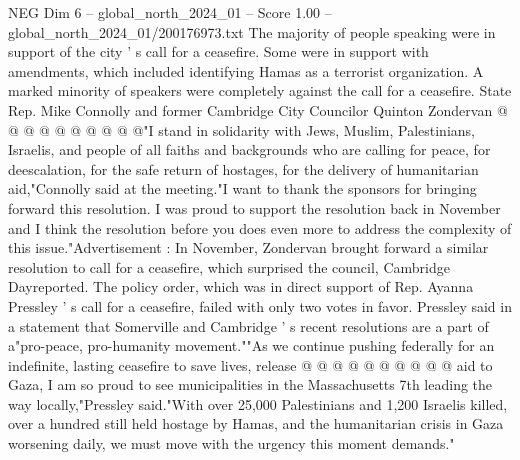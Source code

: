 \begin{textsample}{NEG Dim 6 – global\_north\_2024\_01 – Score 1.00 – global\_north\_2024\_01/200176973.txt}
The majority of people speaking were in support of the city ' s call for a ceasefire.
Some were in support with amendments, which included identifying Hamas as a terrorist organization.
A marked minority of speakers were completely against the call for a ceasefire.
State Rep.
Mike Connolly and former Cambridge City Councilor Quinton Zondervan @ @ @ @ @ @ @ @ @ @"I stand in solidarity with Jews, Muslim, Palestinians, Israelis, and people of all faiths and backgrounds who are calling for peace, for deescalation, for the safe return of hostages, for the delivery of humanitarian aid,"Connolly said at the meeting."I want to thank the sponsors for bringing forward this resolution.
I was proud to support the resolution back in November and I think the resolution before you does even more to address the complexity of this issue."Advertisement : In November, Zondervan brought forward a similar resolution to call for a ceasefire, which surprised the council, Cambridge Dayreported.
The policy order, which was in direct support of Rep.
Ayanna Pressley ' s call for a ceasefire, failed with only two votes in favor.
Pressley said in a statement that Somerville and Cambridge ' s recent resolutions are a part of a"pro-peace, pro-humanity movement.""As we continue pushing federally for an indefinite, lasting ceasefire to save lives, release @ @ @ @ @ @ @ @ @ @ aid to Gaza, I am so proud to see municipalities in the Massachusetts 7th leading the way locally,"Pressley said."With over 25,000 Palestinians and 1,200 Israelis killed, over a hundred still held hostage by Hamas, and the humanitarian crisis in Gaza worsening daily, we must move with the urgency this moment demands."

\end{textsample}
